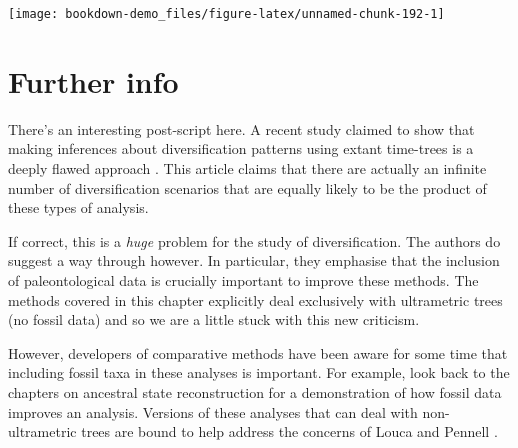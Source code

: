 \documentclass[
]{book}
\newenvironment{Shaded}{\begin{snugshade}}{\end{snugshade}}
\newcommand{\DataTypeTok}[1]{\textcolor[rgb]{0.13,0.29,0.53}{#1}}
\newcommand{\DecValTok}[1]{\textcolor[rgb]{0.00,0.00,0.81}{#1}}
\newcommand{\KeywordTok}[1]{\textcolor[rgb]{0.13,0.29,0.53}{\textbf{#1}}}
\newcommand{\NormalTok}[1]{#1}
\newcommand{\OperatorTok}[1]{\textcolor[rgb]{0.81,0.36,0.00}{\textbf{#1}}}
\newcommand{\StringTok}[1]{\textcolor[rgb]{0.31,0.60,0.02}{#1}}
\begin{document}
\begin{Shaded}
\end{Shaded}

\begin{center}\texttt{[image: bookdown-demo\_files/figure-latex/unnamed-chunk-192-1]} \end{center}

\hypertarget{further-info-5}{%
\section{Further info}\label{further-info-5}}

There's an interesting post-script here. A recent study claimed to show that making inferences about diversification patterns using extant time-trees is a deeply flawed approach \citep{Louca20}. This article claims that there are actually an infinite number of diversification scenarios that are equally likely to be the product of these types of analysis.

If correct, this is a \emph{huge} problem for the study of diversification. The authors do suggest a way through however. In particular, they emphasise that the inclusion of paleontological data is crucially important to improve these methods. The methods covered in this chapter explicitly deal exclusively with ultrametric trees (no fossil data) and so we are a little stuck with this new criticism.

However, developers of comparative methods have been aware for some time that including fossil taxa in these analyses is important. For example, look back to the chapters on ancestral state reconstruction for a demonstration of how fossil data improves an analysis. Versions of these analyses that can deal with non-ultrametric trees are bound to help address the concerns of Louca and Pennell \citeyearpar{Louca20}.
\end{document}
